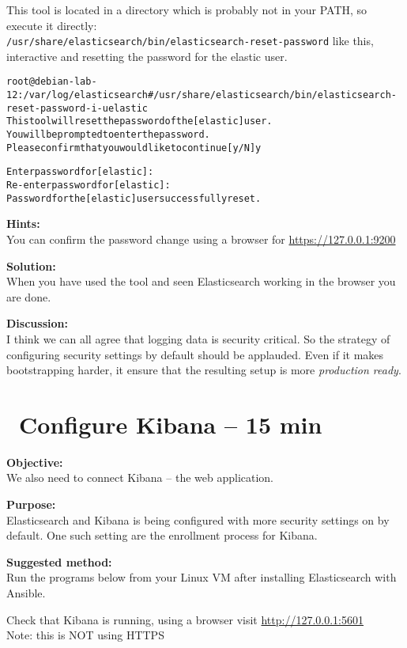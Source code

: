 \documentclass[a4paper,11pt,notitlepage]{report}
\begin{document}
This tool is located in a directory which is probably not in your PATH, so execute it directly:\\
\verb+/usr/share/elasticsearch/bin/elasticsearch-reset-password+ like this, interactive and resetting the password for the elastic user.

\begin{alltt}
root@debian-lab-12:/var/log/elasticsearch# /usr/share/elasticsearch/bin/elasticsearch-reset-password -i -u elastic
This tool will reset the password of the [elastic] user.
You will be prompted to enter the password.
Please confirm that you would like to continue [y/N]y


Enter password for [elastic]:
Re-enter password for [elastic]:
Password for the [elastic] user successfully reset.
\end{alltt}

{\bf Hints:}\\
You can confirm the password change using a browser for \url{https://127.0.0.1:9200}


{\bf Solution:}\\
When you have used the tool and seen Elasticsearch working in the browser you are done.

{\bf Discussion:}\\
I think we can all agree that logging data is security critical. So the strategy of configuring security settings by default should be applauded. Even if it makes bootstrapping harder, it ensure that the resulting setup is more \emph{production ready}.

\chapter{\faExclamationTriangle\ Configure Kibana -- 15 min}
\label{ex:kibana-enrollment}

{\bf Objective:}\\
We also need to connect Kibana -- the web application.

{\bf Purpose:}\\
Elasticsearch and Kibana is being configured with more security settings on by default. One such setting are the enrollment process for Kibana.

{\bf Suggested method:}\\
Run the programs below from your Linux VM after installing Elasticsearch with Ansible.

Check that Kibana is running, using a browser visit \url{http://127.0.0.1:5601}\\
Note: this is NOT using HTTPS \smiley
\end{document}
